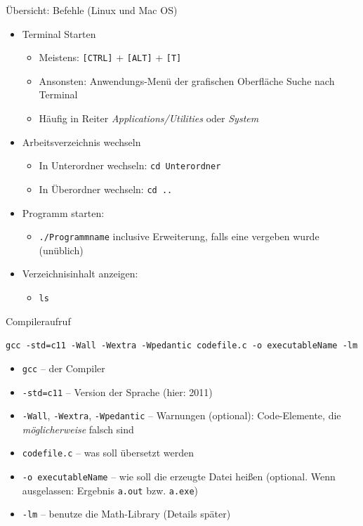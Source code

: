 
\begin{frame}{Übersicht: Befehle (Linux und Mac OS)}
\begin{itemize}
\item Terminal Starten
	\begin{itemize}
	\item Meistens: \texttt{[CTRL]} + \texttt{[ALT]} + \texttt{[T]}
	\item Ansonsten: Anwendungs-Menü der grafischen Oberfläche \thus Suche nach Terminal
	\item Häufig in Reiter \emph{Applications/Utilities} oder \emph{System}
	\end{itemize}
\item Arbeitsverzeichnis wechseln
	\begin{itemize}
	\item In Unterordner wechseln: \texttt{cd Unterordner}
	\item In Überordner wechseln: \texttt{cd ..}
	\end{itemize}
\item Programm starten:
	\begin{itemize}
	\item \texttt{./Programmname} inclusive Erweiterung, falls eine vergeben wurde (unüblich)
	\end{itemize}
\item Verzeichnisinhalt anzeigen:
	\begin{itemize}
	\item \texttt{ls}
	\end{itemize}
\end{itemize}
\end{frame}


\begin{frame}{Compileraufruf}
%
\begin{cmdbox}
  \footnotesize\texttt{gcc -std=c11 -Wall -Wextra -Wpedantic codefile.c -o executableName -lm}
\end{cmdbox}
%
\begin{itemize}
\item \texttt{gcc} -- der Compiler
\item \texttt{-std=c11} -- Version der Sprache (hier: 2011)
\item \texttt{-Wall}, \texttt{-Wextra}, \texttt{-Wpedantic} -- Warnungen (optional): Code-Elemente, die \emph{möglicherweise} falsch sind
\item \texttt{codefile.c} -- was soll übersetzt werden
\item \texttt{-o executableName} -- wie soll die erzeugte Datei heißen (optional. Wenn ausgelassen: Ergebnis \texttt{a.out} bzw. \texttt{a.exe})
\item \texttt{-lm} -- benutze die Math-Library (Details später)
\end{itemize}
%
\end{frame}

